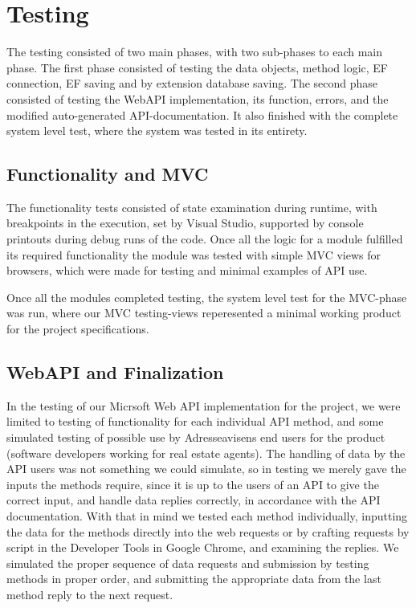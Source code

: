 \section{Testing}

The testing consisted of two main phases, with two sub-phases to each main phase. The first phase consisted of testing the data objects, method logic, EF connection,
EF saving and by extension database saving.
The second phase consisted of testing the WebAPI implementation, its function, errors, and the modified auto-generated API-documentation. It also finished with the
complete system level test, where the system was tested in its entirety.

\subsection{Functionality and MVC}

The functionality tests consisted of state examination during runtime, with breakpoints in the execution, set by Visual Studio, supported by console printouts
during debug runs of the code. Once all the logic for a module fulfilled its required functionality the module was tested with simple MVC views for browsers, 
which were made for testing and minimal examples of API use.

Once all the modules completed testing, the system level test for the MVC-phase was run, where our MVC testing-views reperesented a minimal working product for
the project specifications.

\subsection{WebAPI and Finalization}

In the testing of our Micrsoft Web API implementation for the project, we were limited to testing of functionality for each individual API method, and
some simulated testing of possible use by Adresseavisens end users for the product (software developers working for real estate agents).
The handling of data by the API users was not something we could simulate, so in testing we merely gave the inputs the methods require, since it is up to
the users of an API to give the correct input, and handle data replies correctly, in accordance with the API documentation.
With that in mind we tested each method individually, inputting the data for the methods directly into the web requests or by crafting requests by script in
the Developer Tools in Google Chrome, and examining the replies. 
We simulated the proper sequence of data requests and submission by testing methods in proper order, and submitting the appropriate data from the last method reply
to the next request.

